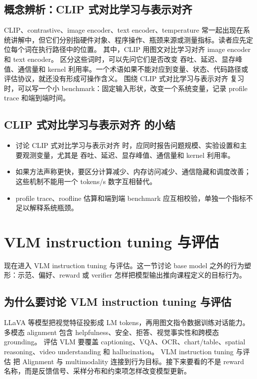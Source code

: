 \documentclass[a4paper]{article}
\begin{document}
\subsection{概念辨析：CLIP 式对比学习与表示对齐}
CLIP、contrastive、image encoder、text encoder、temperature 常一起出现在系统讲解中，但它们分别指硬件对象、程序操作、瓶颈来源或测量指标。读者应先定位每个词在执行路径中的位置。
其中，CLIP 用图文对比学习对齐 image encoder 和 text encoder。
区分这些词时，可以先问它们是否改变 吞吐、延迟、显存峰值、通信量和 kernel 利用率。一个术语如果不能对应到变量、状态、代码路径或评估协议，就还没有形成可操作含义。
围绕 CLIP 式对比学习与表示对齐 复习时，可以写一个小 benchmark：固定输入形状，改变一个系统变量，记录 profile trace 和端到端时间。
\subsection{CLIP 式对比学习与表示对齐 的小结}
\begin{itemize}
\item 讨论 CLIP 式对比学习与表示对齐 时，应同时报告问题规模、实验设置和主要观测变量，尤其是 吞吐、延迟、显存峰值、通信量和 kernel 利用率。
\item 如果方法声称更快，要区分计算减少、内存访问减少、通信隐藏和调度改善；这些机制不能用一个 tokens/s 数字互相替代。
\item profile trace、roofline 估算和端到端 benchmark 应互相校验，单独一个指标不足以解释系统瓶颈。
\end{itemize}
\section{VLM instruction tuning 与评估}
现在进入 VLM instruction tuning 与评估。这一节讨论 base model 之外的行为塑形：示范、偏好、reward 或 verifier 怎样把模型输出推向课程定义的目标行为。
\subsection{为什么要讨论 VLM instruction tuning 与评估}
LLaVA 等模型把视觉特征投影成 LM tokens，再用图文指令数据训练对话能力。
多模态 alignment 包含 helpfulness、安全、拒答、视觉事实性和跨模态 grounding。
评估 VLM 要覆盖 captioning、VQA、OCR、chart/table、spatial reasoning、video understanding 和 hallucination。
VLM instruction tuning 与评估 把 Alignment 与 multimodality 连接到行为目标。接下来要看的不是 reward 名称，而是反馈信号、采样分布和约束项怎样改变模型更新。
\end{document}
